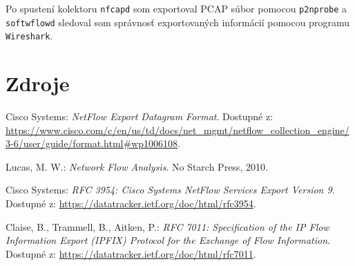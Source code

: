 \documentclass[11pt, a4paper]{article}
\begin{document}
Po spustení kolektoru \texttt{nfcapd} som exportoval PCAP súbor pomocou \texttt{p2nprobe} a
\texttt{softwflowd} sledoval som správnosť exportovaných informácií pomocou programu 
\texttt{Wireshark}.

\newpage

\section*{Zdroje}

\begin{thebibliography}{9}

Cisco Systems: \emph{NetFlow Export Datagram Format}. Dostupné z: 
\url{https://www.cisco.com/c/en/us/td/docs/net_mgmt/netflow_collection_engine/3-6/user/guide/format.html#wp1006108}.

Lucas, M. W.: \emph{Network Flow Analysis}. No Starch Press, 2010.

Cisco Systems: \emph{RFC 3954: Cisco Systems NetFlow Services Export Version 9}. Dostupné z: 
\url{https://datatracker.ietf.org/doc/html/rfc3954}.

Claise, B., Trammell, B., Aitken, P.: \emph{RFC 7011: Specification of the IP Flow Information Export (IPFIX) Protocol for the Exchange of Flow Information}. Dostupné z: 
\url{https://datatracker.ietf.org/doc/html/rfc7011}.

\end{thebibliography}
\end{document}
